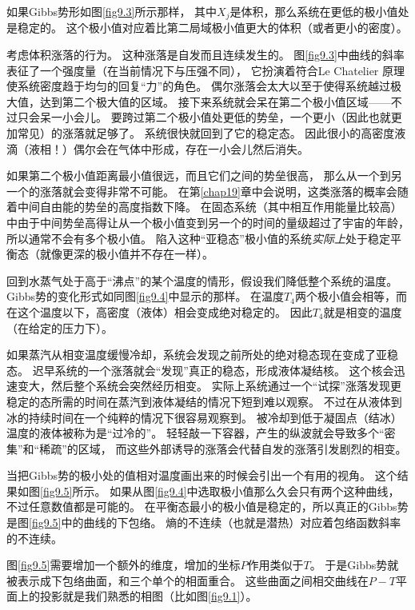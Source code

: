 如果Gibbs势形如图\ref{fig9.3}所示那样，
其中$X_j$是体积，那么系统在更低的极小值处是稳定的。
这个极小值对应着比第二局域极小值更大的体积（或者更小的密度）。

考虑体积涨落的行为。
这种涨落是自发而且连续发生的。
图\ref{fig9.3}中曲线的斜率表征了一个强度量（在当前情况下与压强不同），
它扮演着符合Le Chatelier 原理使系统密度趋于均匀的回复“力”的角色。
偶尔涨落会太大以至于使得系统越过极大值，达到第二个极大值的区域。
接下来系统就会呆在第二个极小值区域——不过只会呆一小会儿。
要跨过第二个极小值处更低的势垒，一个更小（因此也就更加常见）的涨落就足够了。
系统很快就回到了它的稳定态。
因此很小的高密度液滴（液相！）偶尔会在气体中形成，存在一小会儿然后消失。

如果第二个极小值距离最小值很远，而且它们之间的势垒很高，
那么从一个到另一个的涨落就会变得非常不可能。
在第\ref{chap19}章中会说明，这类涨落的概率会随着中间自由能的势垒的高度指数下降。
在固态系统（其中相互作用能量比较高）中由于中间势垒高得让从一个极小值变到另一个的时间的量级超过了宇宙的年龄，所以通常不会有多个极小值。
陷入这种“亚稳态”极小值的系统{\it 实际上}处于稳定平衡态（就像更深的极小值并不存在一样）。

回到水蒸气处于高于“沸点”的某个温度的情形，假设我们降低整个系统的温度。
Gibbs势的变化形式如同图\ref{fig9.4}中显示的那样。
在温度$T_4$两个极小值会相等，而在这个温度以下，高密度（液体）相会变成绝对稳定的。
因此$T_4$就是相变的温度（在给定的压力下）。

如果蒸汽从相变温度缓慢冷却，系统会发现之前所处的绝对稳态现在变成了亚稳态。
迟早系统的一个涨落就会“发现”真正的稳态，形成液体凝结核。
这个核会迅速变大，然后整个系统会突然经历相变。
实际上系统通过一个“试探”涨落发现更稳定的态所需的时间在蒸汽到液体凝结的情况下短到难以观察。
不过在从液体到冰的持续时间在一个纯粹的情况下很容易观察到。
被冷却到低于凝固点（结冰）温度的液体被称为是“过冷的”。
轻轻敲一下容器，产生的纵波就会导致多个“密集”和“稀疏”的区域，
而这些外部诱导的涨落会代替自发的涨落引发剧烈的相变。

当把Gibbs势的极小处的值相对温度画出来的时候会引出一个有用的视角。
这个结果如图\ref{fig9.5}所示。
如果从图\ref{fig9.4}中选取极小值那么久会只有两个这种曲线，
不过任意数值都是可能的。
在平衡态最小的极小值是稳定的，所以真正的Gibbs势是图\ref{fig9.5}中的曲线的下包络。
熵的不连续（也就是潜热）对应着包络函数斜率的不连续。

图\ref{fig9.5}需要增加一个额外的维度，增加的坐标$P$作用类似于$T$。
于是Gibbs势就被表示成下包络曲面，和三个单个的相面重合。
这些曲面之间相交曲线在$P-T$平面上的投影就是我们熟悉的相图（比如图\ref{fig9.1}）。

